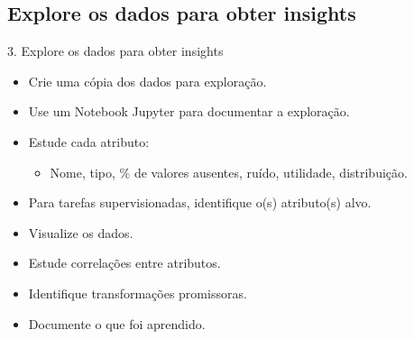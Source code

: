 \documentclass{beamer}
\begin{document}
\subsection{Explore os dados para obter insights}
\begin{frame}{3. Explore os dados para obter insights}
    \begin{itemize}
        \item Crie uma cópia dos dados para exploração.
        \item Use um Notebook Jupyter para documentar a exploração.
        \item Estude cada atributo:
            \begin{itemize}
                \item Nome, tipo, \% de valores ausentes, ruído, utilidade, distribuição.
            \end{itemize}
        \item Para tarefas supervisionadas, identifique o(s) atributo(s) alvo.
        \item Visualize os dados.
        \item Estude correlações entre atributos.
        \item Identifique transformações promissoras.
        \item Documente o que foi aprendido.
    \end{itemize}
\end{frame}
\end{document}
